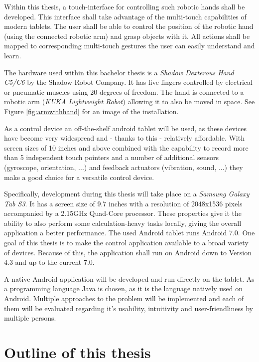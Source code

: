Within this thesis, a touch-interface for controlling such robotic hands shall be developed. This interface shall take advantage of the multi-touch capabilities of modern tablets. The user shall be able to control the position of the robotic hand (using the connected robotic arm) and grasp objects with it. All actions shall be mapped to corresponding multi-touch gestures the user can easily understand and learn.

The hardware used within this bachelor thesis is a \textit{Shadow Dexterous Hand C5/C6} by the Shadow Robot Company. It has five fingers controlled by electrical or pneumatic muscles using 20 degrees-of-freedom\cite{web:robothand:spec}. The hand is connected to a robotic arm (\textit{KUKA Lightweight Robot}) allowing it to also be moved in space. See Figure \ref{fig:armwithhand} for an image of the installation.

As a control device an off-the-shelf android tablet will be used, as these devices have become very widespread and - thanks to this - relatively affordable. With screen sizes of 10 inches and above combined with the capability to record more than 5 independent touch pointers and a number of additional sensors (gyroscope, orientation, ...) and feedback actuators (vibration, sound, ...) they make a good choice for a versatile control device.

Specifically, development during this thesis will take place on a \textit{Samsung Galaxy Tab S3}. It has a screen size of 9.7 inches\cite{samsung:galaxytabs3} with a resolution of 2048x1536 pixels accompanied by a 2.15GHz Quad-Core processor. These properties give it the ability to also perform some calculation-heavy tasks locally, giving the overall application a better performance. The used Android tablet runs Android 7.0. One goal of this thesis is to make the control application available to a broad variety of devices. Because of this, the application shall run on Android down to Version 4.3 and up to the current 7.0.

A native Android application will be developed and run directly on the tablet. As a programming language Java is chosen, as it is the language natively used on Android. Multiple approaches to the problem will be implemented and each of them will be evaluated regarding it's usability, intuitivity and user-friendliness by multiple persons.

\section[Outline]{Outline of this thesis}

